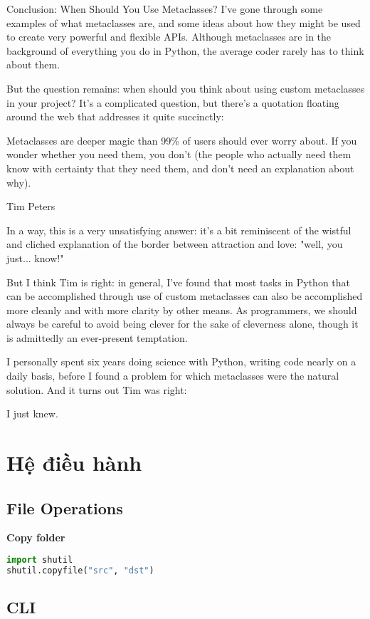 Conclusion: When Should You Use Metaclasses?
I've gone through some examples of what metaclasses are, and some ideas about how they might be used to create very powerful and flexible APIs. Although metaclasses are in the background of everything you do in Python, the average coder rarely has to think about them.

But the question remains: when should you think about using custom metaclasses in your project? It's a complicated question, but there's a quotation floating around the web that addresses it quite succinctly:

Metaclasses are deeper magic than 99\% of users should ever worry about. If you wonder whether you need them, you don't (the people who actually need them know with certainty that they need them, and don't need an explanation about why).

Tim Peters

In a way, this is a very unsatisfying answer: it's a bit reminiscent of the wistful and cliched explanation of the border between attraction and love: "well, you just... know!"

But I think Tim is right: in general, I've found that most tasks in Python that can be accomplished through use of custom metaclasses can also be accomplished more cleanly and with more clarity by other means. As programmers, we should always be careful to avoid being clever for the sake of cleverness alone, though it is admittedly an ever-present temptation.

I personally spent six years doing science with Python, writing code nearly on a daily basis, before I found a problem for which metaclasses were the natural solution. And it turns out Tim was right:

I just knew.

\section{Hệ điều hành}

\subsection{File Operations}

\textbf{Copy folder}

\begin{lstlisting}[language=Python]
import shutil
shutil.copyfile("src", "dst")
\end{lstlisting}


\subsection{CLI}

